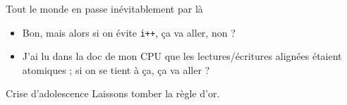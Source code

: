 \documentclass[xcolor={x11names,svgnames},x11names,svgnames]{beamer}
\begin{document}

\begin{frame}[label=guru_switch]
  \begin{exampleblock}{Tout le monde en passe inévitablement par là}
    \begin{itemize}
    \item Bon, mais alors si on évite \texttt{i++}, ça va aller, non ?
    \item J'ai lu dans la doc de mon CPU que les lectures/écritures alignées étaient atomiques ; si on se tient à ça, ça va aller ?
    \end{itemize}
  \end{exampleblock}

  \pause\bigskip
  \begin{alertblock}{Crise d'adolescence}
    Laissons tomber la règle d'or.
  \end{alertblock}

  \pause\bigskip
  
  
\end{frame}    

\end{document}
